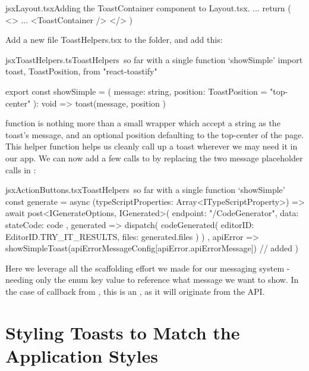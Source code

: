 \documentclass[a4paper,headinclude=on,footinclude=on,12pt,oneside]{scrbook}
\begin{document}
\begin{codeInput}{jsx}{Layout.tsx}{Adding the ToastContainer component to Layout.tsx.}
...
return (
  <>
    ...
    <ToastContainer />
  </>
)
\end{codeInput}

Add a new file {ToastHelpers.tsx} to the  folder, and add this:

\begin{codeInput}{jsx}{ToastHelpers.ts}{ToastHelpers\, so far with a single function `showSimple'}
import {
  toast,
  ToastPosition,
} from "react-toastify"

export const showSimple = (
  message: string,
  position: ToastPosition = "top-center"
): void => {
  toast(message, { position })
}  
\end{codeInput}

 function is nothing more than a small wrapper which accept a string as the toast's message, and an optional position defaulting to the top-center of the page. This helper function helps us cleanly call up a toast wherever we may need it in our app. We can now add a few calls to  by replacing the two message placeholder  calls in :

\begin{codeInput}{jsx}{ActionButtons.tsx}{ToastHelpers\, so far with a single function `showSimple'}
const generate = async (typeScriptProperties: Array<ITypeScriptProperty>) => {
  await post<IGenerateOptions, IGenerated>(
    {
      endpoint: "/CodeGenerator",
      data: {
        stateCode: code
      }
    },
    generated => {
      dispatch(
        codeGenerated({
          editorID: EditorID.TRY_IT_RESULTS,
          files: generated.files
        })
      )
    },
    apiError => {
      showSimpleToast(apiErrorMessageConfig[apiError.apiErrorMessage]) // added
    }
  )
}
\end{codeInput}

Here we leverage all the scaffolding effort we made for our messaging system - needing only the enum key value to reference what message we want to show. In the case of  callback from , this is an , as it will originate from the API.

\section{Styling Toasts to Match the Application Styles}
\end{document}

